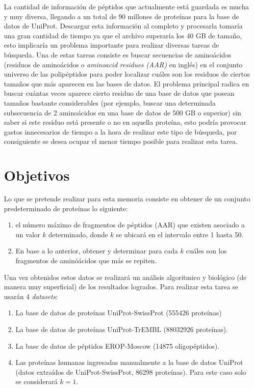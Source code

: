 La cantidad de información de péptidos que actualmente está guardada es mucha y muy diversa, llegando a un total de 90 millones de proteínas para la base de datos de UniProt. Descargar esta información al completo y procesarla tomaría una gran cantidad de tiempo ya que el archivo superaría los 40 GB de tamaño, esto implicaría un problema importante para realizar diversas tareas de búsqueda. Una de estas tareas consiste es buscar secuencias de aminoácidos (residuos de aminoácidos o \textit{aminoacid residues (AAR)} en inglés) en el conjunto universo de las polipéptidos para poder localizar cuáles son los residuos de ciertos tamaños que más aparecen en las bases de datos. El problema principal radica en buscar cuántas veces aparece cierto residuo de una base de datos que posean tamaños bastante considerables (por ejemplo, buscar una determinada subsecuencia de 2 aminoácidos en una base de datos de 500 GB o superior) sin saber si este residuo está presente o no en aquella proteína, esto podría provocar gastos innecesarios de tiempo a la hora de realizar este tipo de búsqueda, por consiguiente se desea ocupar el menor tiempo posible para realizar esta tarea.

\section{Objetivos}

Lo que se pretende realizar para esta memoria consiste en obtener de un conjunto predeterminado de proteínas lo siguiente:

\begin{enumerate}

\item el número máximo de fragmentos de péptidos (AAR) que existen asociado a un valor $k$ determinado, donde $k$ se ubicará en el intervalo entre 1 hasta 50.
\item En base a lo anterior, obtener y determinar para cada $k$ cuáles son los fragmentos de aminóácidos que más se repiten.

\end{enumerate}

Una vez obtenidos estos datos se realizará un análisis algoritmico y biológico (de manera muy superficial) de los resultados logrados. Para realizar esta tarea se usarán 4 \textit{datasets}:
 
\begin{enumerate}

\item La base de datos de proteínas UniProt-SwissProt \cite{swissprot} (555426 proteínas)
\item La base de datos de proteínas UniProt-TrEMBL \cite{trembl} (88032926 proteínas).
\item La base de datos de péptidos EROP-Moscow \cite{eropmoscow} (14875 oligopéptidos).
\item Las proteínas humanas ingresadas manualmente a la base de datos UniProt (datos extraídos de UniProt-SwissProt, 86298 proteínas). Para este caso solo se considerará $k=1$.

\end{enumerate}
